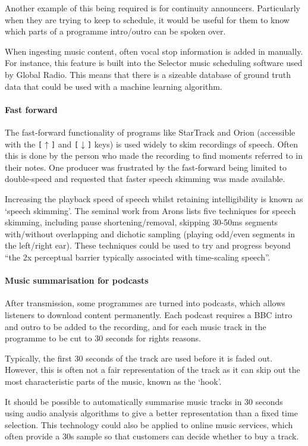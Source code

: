 Another example of this being required is for continuity announcers.
Particularly when they are trying to keep to schedule, it would be useful for
them to know which parts of a programme intro/outro can be spoken over.

When ingesting music content, often vocal stop information is added in
manually. For instance, this feature is built into the Selector music
scheduling software used by Global Radio. This means that there is a sizeable
database of ground truth data that could be used with a machine learning
algorithm.

\paragraph{Fast forward}
The fast-forward functionality of programs like StarTrack and Orion (accessible
with the \texttt{[$\uparrow$]} and \texttt{[$\downarrow$]} keys) is used widely
to skim recordings of speech. Often this is done by the person who made the
recording to find moments referred to in their notes. One producer was
frustrated by the fast-forward being limited to double-speed and requested that
faster speech skimming was made available.

Increasing the playback speed of speech whilst retaining intelligibility is
known as `speech skimming'. The seminal work from Arons \citep{Arons1997} lists
five techniques for speech skimming, including pause shortening/removal,
skipping 30-50ms segments with/without overlapping and dichotic sampling
(playing odd/even segments in the left/right ear). These techniques could be
used to try and progress beyond ``the 2x perceptual barrier typically
associated with time-scaling speech''.

\paragraph{Music summarisation for podcasts}
After transmission, some programmes are turned into podcasts, which allows
listeners to download content permanently. Each podcast requires a BBC intro
and outro to be added to the recording, and for each music track in the
programme to be cut to 30 seconds for rights reasons.

Typically, the first 30 seconds of the track are used before it is faded out.
However, this is often not a fair representation of the track as it can skip
out the most characteristic parts of the music, known as the `hook'.

It should be possible to automatically summarise music tracks in 30 seconds
using audio analysis algorithms to give a better representation than a fixed
time selection. This technology could also be applied to online music services,
which often provide a 30s sample so that customers can decide whether to buy a
track.

